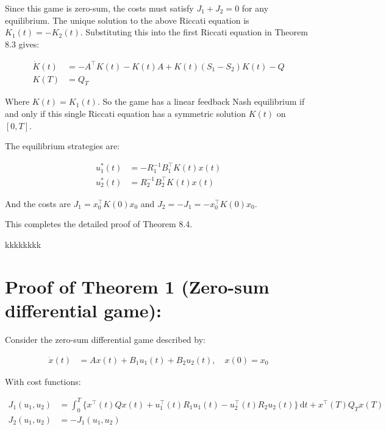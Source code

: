 \documentclass[3p]{elsarticle}
\begin{document}
Since this game is zero-sum, the costs must satisfy $J_1 + J_2 = 0$ for any equilibrium. The unique solution to the above Riccati equation is $K_1(t) = -K_2(t)$. Substituting this into the first Riccati equation in Theorem 8.3 gives:

\begin{align*} 
\dot{K}(t) &= -A^\top K(t) - K(t)A + K(t)(S_1-S_2)K(t) - Q \\
K(T) &= Q_T
\end{align*}

Where $K(t) = K_1(t)$. So the game has a linear feedback Nash equilibrium if and only if this single Riccati equation has a symmetric solution $K(t)$ on $[0,T]$. 

The equilibrium strategies are:

\begin{align*}
u_1^*(t) &= -R_1^{-1}B_1^\top K(t) x(t) \\ 
u_2^*(t) &= R_2^{-1}B_2^\top K(t) x(t)
\end{align*}

And the costs are $J_1 = x_0^\top K(0) x_0$ and $J_2 = -J_1 = -x_0^\top K(0) x_0$.

This completes the detailed proof of Theorem 8.4.



kkkkkkkk

\section*{Proof of Theorem 1 (Zero-sum differential game):}

Consider the zero-sum differential game described by:

\begin{align*}
\dot{x}(t) &= Ax(t) + B_1u_1(t) + B_2u_2(t), \quad x(0)=x_0
\end{align*}

With cost functions:

\begin{align*}
J_1(u_1,u_2) &= \int_0^T \{x^\top (t)Qx(t) + u_1^\top(t) R_1u_1(t) - u_2^\top(t)R_2u_2(t)\}\,\mathrm{d}t + x^\top(T)Q_Tx(T) \\
J_2(u_1,u_2) &= -J_1(u_1,u_2)
\end{align*}
\end{document}
